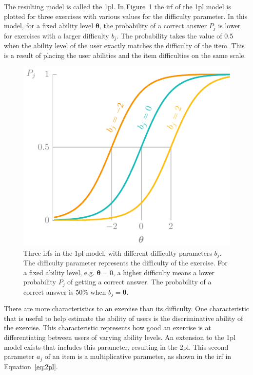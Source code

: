 The resulting model is called the \gls{1pl}. 
In Figure~\ref{fig:1pl} the \gls{irf} of the \gls{1pl} model is plotted for three exercises with various values for the difficulty parameter.
In this model, for a fixed ability level $\bm\theta$, the probability of a correct answer $P_j$ is lower for exercises with a larger difficulty $b_j$.
The probability takes the value of 0.5 when the ability level of the user exactly matches the difficulty of the item.
This is a result of placing the user abilities and the item difficulties on the same scale.

\begin{figure}
    \centering
    \includegraphics[page=1]{03-education/figures/tikzfigures.pdf}
    \caption[Item response functions of the 1PL model]{Three \glspl{irf} in the \gls{1pl} model, with different difficulty parameters $b_j$. The difficulty parameter represents the difficulty of the exercise. 
    For a fixed ability level, e.g. $\bm\theta = 0$, a higher difficulty means a lower probability $P_j$ of getting a correct answer.
    The probability of a correct answer is 50\% when $b_j = \bm\theta$.}
    \label{fig:1pl}
\end{figure}

There are more characteristics to an exercise than its difficulty. 
One characteristic that is useful to help estimate the ability of users is the discriminative ability of the exercise.
This characteristic represents how good an exercise is at differentiating between users of varying ability levels.
An extension to the \gls{1pl} model exists that includes this parameter, resulting in the \gls{2pl}. 
This second parameter $a_j$ of an item is a multiplicative parameter, as shown in the \gls{irf} in Equation~\ref{eq:2pl}.

